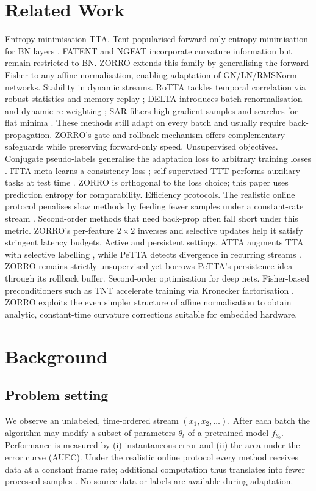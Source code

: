 \documentclass{article} %
\begin{document}
\section{Related Work}
\label{sec:related}
Entropy-minimisation TTA. Tent popularised forward-only entropy minimisation for BN layers \cite{wang-2020-tent}. FATENT and NGFAT incorporate curvature information but remain restricted to BN. ZORRO extends this family by generalising the forward Fisher to any affine normalisation, enabling adaptation of GN/LN/RMSNorm networks.
Stability in dynamic streams. RoTTA tackles temporal correlation via robust statistics and memory replay \cite{yuan-2023-robust}; DELTA introduces batch renormalisation and dynamic re-weighting \cite{zhao-2023-delta}; SAR filters high-gradient samples and searches for flat minima \cite{niu-2023-towards}. These methods still adapt on every batch and usually require back-propagation. ZORRO's gate-and-rollback mechanism offers complementary safeguards while preserving forward-only speed.
Unsupervised objectives. Conjugate pseudo-labels generalise the adaptation loss to arbitrary training losses \cite{goyal-2022-test}. ITTA meta-learns a consistency loss \cite{chen-2023-improved}; self-supervised TTT performs auxiliary tasks at test time \cite{sun-2019-test}. ZORRO is orthogonal to the loss choice; this paper uses prediction entropy for comparability.
Efficiency protocols. The realistic online protocol penalises slow methods by feeding fewer samples under a constant-rate stream \cite{alfarra-2023-evaluation}. Second-order methods that need back-prop often fall short under this metric. ZORRO's per-feature \(2\times2\) inverses and selective updates help it satisfy stringent latency budgets.
Active and persistent settings. ATTA augments TTA with selective labelling \cite{gui-2024-active}, while PeTTA detects divergence in recurring streams \cite{hoang-2023-persistent}. ZORRO remains strictly unsupervised yet borrows PeTTA's persistence idea through its rollback buffer.
Second-order optimisation for deep nets. Fisher-based preconditioners such as TNT accelerate training via Kronecker factorisation \cite{ren-2021-tensor}. ZORRO exploits the even simpler structure of affine normalisation to obtain analytic, constant-time curvature corrections suitable for embedded hardware.

\section{Background}
\label{sec:background}
\subsection{Problem setting}
We observe an unlabeled, time-ordered stream \((x_1, x_2,\dots)\). After each batch the algorithm may modify a subset of parameters \(\theta_t\) of a pretrained model \(f_{\theta_0}\). Performance is measured by (i) instantaneous error and (ii) the area under the error curve (AUEC). Under the realistic online protocol every method receives data at a constant frame rate; additional computation thus translates into fewer processed samples \cite{alfarra-2023-evaluation}. No source data or labels are available during adaptation.
\end{document}
